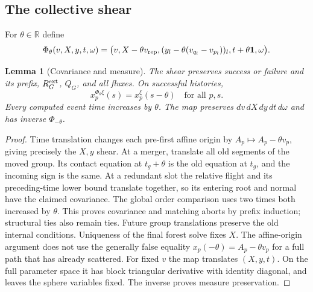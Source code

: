 \documentclass[11pt]{article}
\newcommand{\R}{\mathbb R}
\newcommand{\dd}{\,d}
\newtheorem{lemma}[theorem]{Lemma}
\theoremstyle{definition}\newtheorem{definition}[theorem]{Definition}
\theoremstyle{remark}\newtheorem{remark}[theorem]{Remark}
\numberwithin{equation}{section}
\begin{document}
\subsection{The collective shear}\label{subsec:shear}
For $\theta\in\R$ define
\begin{equation}\label{eq:shear}
 \Phi_\theta(v,X,y,t,\omega)=
 \bigl(v,X-\theta v_{\rm rep},
       (y_l-\theta(v_{q_l}-v_{p_l}))_l,t+\theta\mathbf1,\omega\bigr).
\end{equation}
\begin{lemma}[Covariance and measure]\label{lem:shear}
The shear preserves success or failure and its prefix, $R_G^{\rm ext}$,
$Q_G$, and all fluxes. On successful histories,
\[
 x_p^{\Phi_\theta\xi}(s)=x_p^\xi(s-\theta)
       \quad\text{for all }p,s.
\]
Every computed event time increases by $\theta$. The map preserves
$dv\dd X\dd y\dd t\dd\omega$ and has inverse $\Phi_{-\theta}$.
\end{lemma}
\begin{proof}
Time translation changes each pre-first affine origin by
$A_p\mapsto A_p-\theta v_p$, giving precisely the $X,y$ shear. At a merger,
translate all old segments of the moved group. Its contact equation at
$t_g+\theta$ is the old equation at $t_g$, and the incoming sign is the
same. At a redundant slot the relative flight and its preceding-time lower
bound translate together, so its entering root and normal have the claimed
covariance. The global order comparison uses two times both increased by
$\theta$. This proves covariance and matching aborts by prefix induction;
structural ties also remain ties. Future group translations preserve the
old internal conditions. Uniqueness of the final forest solve fixes $X$.
The affine-origin argument does not use the generally false equality
$x_p(-\theta)=A_p-\theta v_p$ for a full path that has already scattered.
For fixed $v$ the map translates $(X,y,t)$. On the full parameter space it
has block triangular derivative with identity diagonal, and leaves the
sphere variables fixed. The inverse proves measure preservation.
\end{proof}
\end{document}
